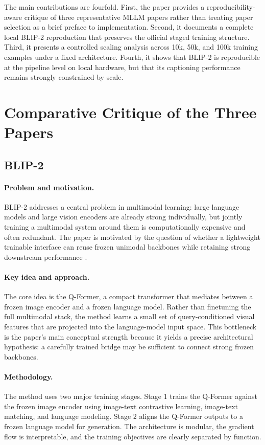 \documentclass[11pt]{article}
\begin{document}
The main contributions are fourfold. First, the paper provides a
reproducibility-aware critique of three representative MLLM papers rather than
treating paper selection as a brief preface to implementation. Second, it documents a
complete local BLIP-2 reproduction that preserves the official staged training
structure. Third, it presents a controlled scaling analysis across 10k, 50k, and 100k
training examples under a fixed architecture. Fourth, it shows that BLIP-2 is
reproducible at the pipeline level on local hardware, but that its captioning
performance remains strongly constrained by scale.

\section{Comparative Critique of the Three Papers}

\subsection{BLIP-2}
\paragraph{Problem and motivation.}
BLIP-2 addresses a central problem in multimodal learning: large language models and
large vision encoders are already strong individually, but jointly training a
multimodal system around them is computationally expensive and often redundant.
The paper is motivated by the question of whether a lightweight trainable interface can
reuse frozen unimodal backbones while retaining strong downstream performance
\citep{li2023blip2}.

\paragraph{Key idea and approach.}
The core idea is the Q-Former, a compact transformer that mediates between a frozen
image encoder and a frozen language model. Rather than finetuning the full
multimodal stack, the method learns a small set of query-conditioned visual features
that are projected into the language-model input space. This bottleneck is the paper's
main conceptual strength because it yields a precise architectural hypothesis: a
carefully trained bridge may be sufficient to connect strong frozen backbones.

\paragraph{Methodology.}
The method uses two major training stages. Stage 1 trains the Q-Former against the
frozen image encoder using image-text contrastive learning, image-text matching, and
language modeling. Stage 2 aligns the Q-Former outputs to a frozen language model for
generation. The architecture is modular, the gradient flow is interpretable, and the
training objectives are clearly separated by function.
\end{document}
